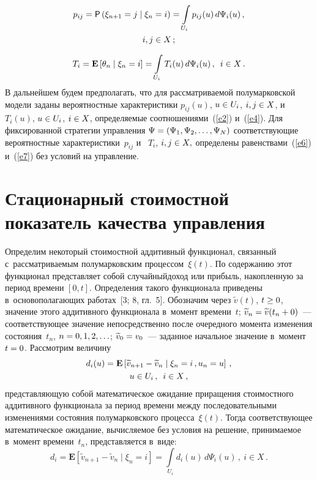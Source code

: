 \begin{multicols}{2}
\vspace*{-12pt}

\noindent
\begin{multline}
p_{ij}={\sf P}\left(\xi_{n+1}=j \mid \xi_n=i\right)=
\int\limits_{U_i}p_{ij}(u)\, d\Psi_i(u)\,,\\  
i,j\in X\,; 
\label{e6}
\end{multline}

\vspace*{-9pt}

\noindent
\begin{equation}
T_{i}=\mathbf{E}\left[\theta_n \mid \xi_n=i\right]=
\int\limits_{U_i}T_{i}(u)\,d\Psi_i(u)\,,\enskip i\in X\,. 
\label{e7}
\end{equation}
В дальнейшем будем предполагать, что для рас\-смат\-ри\-ва\-емой 
полумарковской модели заданы вероятностные характеристики 
$p_{ij}(u)$, $u\hm\in U_i$, $i,j\hm\in X$, и~$T_i(u)$, $u\hm\in U_i$, $i\hm\in X$, 
определяемые соотношениями~(\ref{e2}) и~(\ref{e4}). 
Для фиксированной стратегии управления $\Psi\hm=(\Psi_1, \Psi_2,\ldots, \Psi_N)$ 
соответствующие вероятностные характеристики~$p_{ij}$ и~ $T_i$, $i,j\hm\in X,$ 
определены равенствами~(\ref{e6}) и~(\ref{e7}) без условий на управление.

\section{Стационарный стоимостной показатель качества управления}

Определим некоторый стоимостной аддитивный функционал, связанный 
с~рассматриваемым полумарковским процессом~$\xi(t)$. По содержанию этот функционал 
представляет собой случайный\linebreak доход или прибыль, накопленную за период времени $[0,t]$. 
Определения такого функционала приведены в~основополагающих работах~[3; 8, гл.~5].\linebreak 
Обозначим через $\widetilde{v}(t)$, $t\hm\geq 0$, значение этого аддитивного 
функционала в~момент времени~$t$; $\widetilde{v}_n\hm=\widetilde{v}(t_n\hm+0)$~--- 
соответствующее значение непосредственно после очередного момента изменения\linebreak 
состояния~$t_n$, $n\hm=0,1,2,\ldots$; $\widetilde{v}_0\hm=v_0$~--- 
заданное начальное значение в~момент $t\hm=0$. Рассмотрим величину
\begin{multline}
d_i(u)=\mathbf{E}\left[\widetilde{v}_{n+1}-\widetilde{v}_n \mid \xi_n=i\,, 
u_n=u\right]\,,\\
u\in U_i\,, \enskip i\in X\,, \label{e8}
\end{multline}
представляющую собой математическое ожидание приращения стоимостного 
аддитивного функционала за период времени между последовательными 
изменениями состояния полумарковского процесса~$\xi(t)$. Тогда соответствующее 
математическое ожидание, вычисляемое без условия на решение, 
принимаемое в~момент времени~$t_n$, представляется в~виде:
\begin{equation*}
d_i=\mathbf{E}\left[\widetilde{v}_{n+1}-\widetilde{v}_n \mid \xi_n=i\right]=
\!\int\limits_{U_i}\!d_i(u)\,d\Psi_i(u)\,,\ i\in X \,. %
\end{equation*}


\end{multicols}

